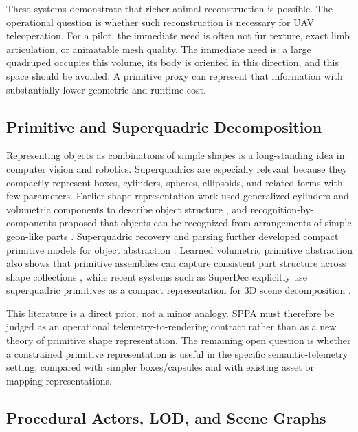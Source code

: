﻿\documentclass[11pt,a4paper]{article}
\begin{document}
These systems demonstrate that richer animal reconstruction is possible. The
operational question is whether such reconstruction is necessary for UAV
teleoperation. For a pilot, the immediate need is often not fur texture, exact
limb articulation, or animatable mesh quality. The immediate need is: a large
quadruped occupies this volume, its body is oriented in this direction, and this
space should be avoided. A primitive proxy can represent that information
with substantially lower geometric and runtime cost.

\subsection{Primitive and Superquadric Decomposition}

Representing objects as combinations of simple shapes is a long-standing idea
in computer vision and robotics. Superquadrics are especially relevant because
they compactly represent boxes, cylinders, spheres, ellipsoids, and related
forms with few parameters. Earlier shape-representation work used generalized
cylinders and volumetric components to describe object structure
\cite{marr1978representation}, and recognition-by-components proposed that
objects can be recognized from arrangements of simple geon-like parts
\cite{biederman1987recognition}. Superquadric recovery and parsing further
developed compact primitive models for object abstraction
\cite{solina1990recovery,paschalidou2019superquadrics}. Learned volumetric
primitive abstraction also shows that primitive assemblies can capture
consistent part structure across shape collections \cite{tulsiani2017learning},
while recent systems such as SuperDec explicitly use superquadric primitives as
a compact representation for 3D scene decomposition \cite{fedele2025superdec}.

This literature is a direct prior, not a minor analogy. SPPA must therefore be
judged as an operational telemetry-to-rendering contract rather than as a new
theory of primitive shape representation. The remaining open question is
whether a constrained primitive representation is useful in the specific
semantic-telemetry setting, compared with simpler boxes/capsules and with existing
asset or mapping representations.

\subsection{Procedural Actors, LOD, and Scene Graphs}
\end{document}
